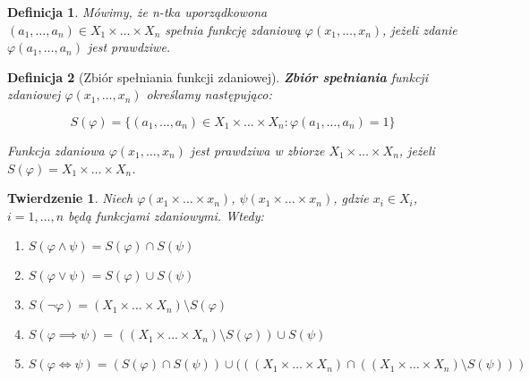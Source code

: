 \documentclass[a5paper,8pt]{article}
\theoremstyle{mythmstyle}
\newtheorem{definition}{Definicja}[section]
\newtheorem{theorem}{Twierdzenie}[section]
\begin{document}
        \begin{definition}
            Mówimy, że n-tka uporządkowona \\
            $ (a_1, \ldots, a_n) \in X_1 \times \ldots \times X_n $ spełnia funkcję zdaniową $ \varphi (x_1, \ldots, x_n) $, jeżeli zdanie $ \varphi (a_1, \ldots, a_n) $ jest prawdziwe.
        \end{definition}

        \begin{definition}[Zbiór spełniania funkcji zdaniowej]
            \textbf{Zbiór spełniania} funkcji zdaniowej $ \varphi (x_1, \ldots, x_n) $ określamy następująco:

            \begin{equation*}
                S(\varphi) = \{ (a_1, \ldots, a_n) \in X_1 \times \ldots \times X_n : \varphi (a_1, \ldots, a_n) = 1 \}
            \end{equation*}

            Funkcja zdaniowa $ \varphi (x_1, \ldots, x_n) $ jest prawdziwa w zbiorze $ X_1 \times \ldots \times X_n $, jeżeli $ S(\varphi) = X_1 \times \ldots \times X_n $.

        \end{definition}
        
        \begin{theorem}
            Niech $ \varphi(x_1 \times \ldots \times x_n) $, $ \psi(x_1 \times \ldots \times x_n) $, gdzie $ x_i \in X_i $, $ i = 1, \ldots, n $ będą funkcjami zdaniowymi. Wtedy:

            \begin{enumerate}[label=\textbf{\arabic*})]
                \item $ S( \varphi \wedge \psi ) = S( \varphi ) \cap S( \psi ) $
                \item $ S( \varphi \vee \psi ) = S( \varphi ) \cup S( \psi ) $
                \item $ S( \neg \varphi ) = (X_1 \times \ldots \times X_n ) \setminus S( \varphi ) $
                \item $ S( \varphi \implies \psi ) = (( X_1 \times \ldots \times X_n ) \setminus S( \varphi ) ) \cup S( \psi ) $
                \item $ S( \varphi \iff \psi ) = ( S( \varphi ) \cap S( \psi ) ) \cup ( ( ( X_1 \times \ldots \times X_n ) \cap ( ( X_1 \times \ldots \times X_n ) \setminus S( \psi ) ) ) $%
            \end{enumerate}

        \end{theorem}
\end{document}
